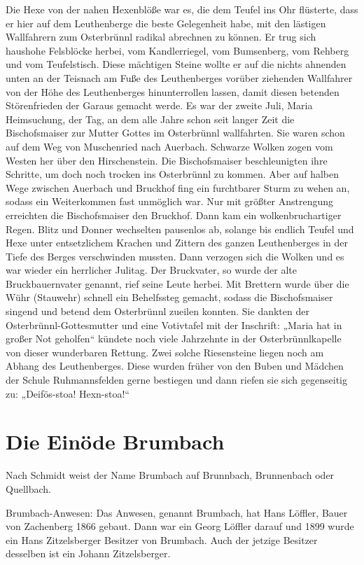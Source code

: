 \documentclass[12pt,a4pager]{book}
\begin{document}
Die Hexe von der nahen Hexenblöße war es, die dem Teufel ins Ohr flüsterte, dass
er hier auf dem Leuthenberge die beste Gelegenheit habe, mit den lästigen
Wallfahrern zum Osterbrünnl radikal abrechnen zu können. Er trug sich haushohe
Felsblöcke herbei, vom Kandlerriegel, vom Bumsenberg, vom Rehberg und vom
Teufelstisch. Diese mächtigen Steine wollte er auf die nichts ahnenden unten an
der Teisnach am Fuße des Leuthenberges vorüber ziehenden Wallfahrer von der Höhe
des Leuthenberges hinunterrollen lassen, damit diesen betenden Störenfrieden der
Garaus gemacht werde. Es war der zweite Juli, Maria Heimsuchung, der Tag, an dem
alle Jahre schon seit langer Zeit die Bischofsmaiser zur Mutter Gottes im
Osterbrünnl wallfahrten. Sie waren schon auf dem Weg von Muschenried nach
Auerbach. Schwarze Wolken zogen vom Westen her über den Hirschenstein. Die
Bischofsmaiser beschleunigten ihre Schritte, um doch noch trocken ins
Osterbrünnl zu kommen. Aber auf halben Wege zwischen Auerbach und Bruckhof fing
ein furchtbarer Sturm zu wehen an, sodass ein Weiterkommen fast unmöglich war.
Nur mit größter Anstrengung erreichten die Bischofsmaiser den Bruckhof. Dann kam
ein wolkenbruchartiger Regen. Blitz und Donner wechselten pausenlos ab, solange
bis endlich Teufel und Hexe unter entsetzlichem Krachen und Zittern des ganzen
Leuthenberges in der Tiefe des Berges verschwinden mussten. Dann verzogen sich
die Wolken und es war wieder ein herrlicher Julitag. Der Bruckvater, so wurde
der alte Bruckbauernvater genannt, rief seine Leute herbei. Mit Brettern wurde
über die Wühr (Stauwehr) schnell ein Behelfssteg gemacht, sodass die
Bischofsmaiser singend und betend dem Osterbrünnl zueilen konnten. Sie dankten
der Osterbrünnl-Gottesmutter und eine Votivtafel mit der Inschrift: „Maria hat
in großer Not geholfen“ kündete noch viele Jahrzehnte in der Osterbrünnlkapelle
von dieser wunderbaren Rettung. Zwei solche Riesensteine liegen noch am Abhang
des Leuthenberges. Diese wurden früher von den Buben und Mädchen der Schule
Ruhmannsfelden gerne bestiegen und dann riefen sie sich gegenseitig zu:
„Deifös-stoa! Hexn-stoa!“

\section{Die Einöde Brumbach}

Nach Schmidt weist der Name Brumbach auf Brunnbach, Brunnenbach oder Quellbach.

Brumbach-Anwesen: Das Anwesen, genannt Brumbach, hat Hans Löffler, Bauer von
Zachenberg 1866 gebaut. Dann war ein Georg Löffler darauf und 1899 wurde ein
Hans Zitzelsberger Besitzer von Brumbach. Auch der jetzige Besitzer desselben
ist ein Johann Zitzelsberger.
\end{document}
